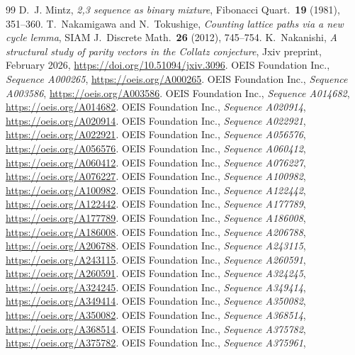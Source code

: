 \documentclass[10pt,a4paper,titlepage]{article}
\begin{document}
\begin{thebibliography}{99}
 D.~J. Mintz, \emph{2,3 sequence as binary mixture}, Fibonacci
  Quart.\ \textbf{19} (1981), 351--360.
 T.~Nakamigawa and N.~Tokushige, \emph{Counting lattice paths via a new
  cycle lemma}, SIAM J.\ Discrete Math.\ \textbf{26} (2012), 745--754.
 K.~Nakanishi, \emph{A structural study of parity
  vectors in the Collatz conjecture}, Jxiv preprint, February 2026,
  \url{https://doi.org/10.51094/jxiv.3096}.
 OEIS Foundation Inc., \emph{Sequence A000265},
  \url{https://oeis.org/A000265}.
 OEIS Foundation Inc., \emph{Sequence A003586},
  \url{https://oeis.org/A003586}.
 OEIS Foundation Inc., \emph{Sequence A014682},
  \url{https://oeis.org/A014682}.
 OEIS Foundation Inc., \emph{Sequence A020914},
  \url{https://oeis.org/A020914}.
 OEIS Foundation Inc., \emph{Sequence A022921},
  \url{https://oeis.org/A022921}.
 OEIS Foundation Inc., \emph{Sequence A056576},
  \url{https://oeis.org/A056576}.
 OEIS Foundation Inc., \emph{Sequence A060412},
  \url{https://oeis.org/A060412}.
 OEIS Foundation Inc., \emph{Sequence A076227},
  \url{https://oeis.org/A076227}.
 OEIS Foundation Inc., \emph{Sequence A100982},
  \url{https://oeis.org/A100982}.
 OEIS Foundation Inc., \emph{Sequence A122442},
  \url{https://oeis.org/A122442}.
 OEIS Foundation Inc., \emph{Sequence A177789},
  \url{https://oeis.org/A177789}.
 OEIS Foundation Inc., \emph{Sequence A186008},
  \url{https://oeis.org/A186008}.
 OEIS Foundation Inc., \emph{Sequence A206788},
  \url{https://oeis.org/A206788}.
 OEIS Foundation Inc., \emph{Sequence A243115},
  \url{https://oeis.org/A243115}.
 OEIS Foundation Inc., \emph{Sequence A260591},
  \url{https://oeis.org/A260591}.
 OEIS Foundation Inc., \emph{Sequence A324245},
  \url{https://oeis.org/A324245}.
 OEIS Foundation Inc., \emph{Sequence A349414},
  \url{https://oeis.org/A349414}.
 OEIS Foundation Inc., \emph{Sequence A350082},
  \url{https://oeis.org/A350082}.
 OEIS Foundation Inc., \emph{Sequence A368514},
  \url{https://oeis.org/A368514}.
 OEIS Foundation Inc., \emph{Sequence A375782},
  \url{https://oeis.org/A375782}.
 OEIS Foundation Inc., \emph{Sequence A375961},

\end{thebibliography}
\end{document}
